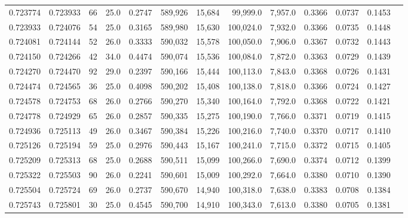 \begin{tabular}{rrrrrrrrrrrrr}
0.723774 & 0.723933 &    66 & 25.0 &                                     0.2747 & 589,926 &  15,684 &  99,999.0 &   7,957.0 & 0.3366 & 0.0737 & 0.1453 \\
0.723933 & 0.724076 &    54 & 25.0 &                                     0.3165 & 589,980 &  15,630 & 100,024.0 &   7,932.0 & 0.3366 & 0.0735 & 0.1448 \\
0.724081 & 0.724144 &    52 & 26.0 &                                     0.3333 & 590,032 &  15,578 & 100,050.0 &   7,906.0 & 0.3367 & 0.0732 & 0.1443 \\
0.724150 & 0.724266 &    42 & 34.0 &                                     0.4474 & 590,074 &  15,536 & 100,084.0 &   7,872.0 & 0.3363 & 0.0729 & 0.1439 \\
0.724270 & 0.724470 &    92 & 29.0 &                                     0.2397 & 590,166 &  15,444 & 100,113.0 &   7,843.0 & 0.3368 & 0.0726 & 0.1431 \\
0.724474 & 0.724565 &    36 & 25.0 &                                     0.4098 & 590,202 &  15,408 & 100,138.0 &   7,818.0 & 0.3366 & 0.0724 & 0.1427 \\
0.724578 & 0.724753 &    68 & 26.0 &                                     0.2766 & 590,270 &  15,340 & 100,164.0 &   7,792.0 & 0.3368 & 0.0722 & 0.1421 \\
0.724778 & 0.724929 &    65 & 26.0 &                                     0.2857 & 590,335 &  15,275 & 100,190.0 &   7,766.0 & 0.3371 & 0.0719 & 0.1415 \\
0.724936 & 0.725113 &    49 & 26.0 &                                     0.3467 & 590,384 &  15,226 & 100,216.0 &   7,740.0 & 0.3370 & 0.0717 & 0.1410 \\
0.725126 & 0.725194 &    59 & 25.0 &                                     0.2976 & 590,443 &  15,167 & 100,241.0 &   7,715.0 & 0.3372 & 0.0715 & 0.1405 \\
0.725209 & 0.725313 &    68 & 25.0 &                                     0.2688 & 590,511 &  15,099 & 100,266.0 &   7,690.0 & 0.3374 & 0.0712 & 0.1399 \\
0.725322 & 0.725503 &    90 & 26.0 &                                     0.2241 & 590,601 &  15,009 & 100,292.0 &   7,664.0 & 0.3380 & 0.0710 & 0.1390 \\
0.725504 & 0.725724 &    69 & 26.0 &                                     0.2737 & 590,670 &  14,940 & 100,318.0 &   7,638.0 & 0.3383 & 0.0708 & 0.1384 \\
0.725743 & 0.725801 &    30 & 25.0 &                                     0.4545 & 590,700 &  14,910 & 100,343.0 &   7,613.0 & 0.3380 & 0.0705 & 0.1381 \\

\end{tabular}
